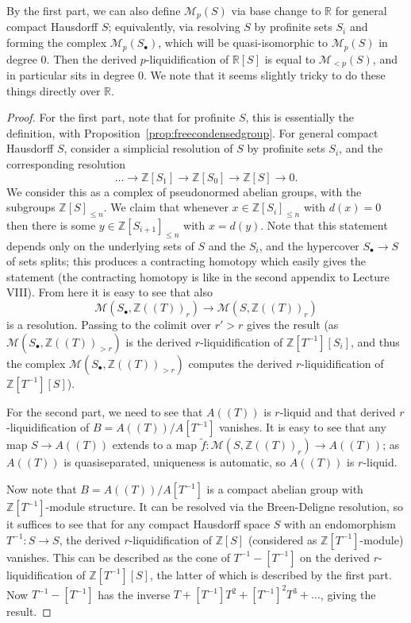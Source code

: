 \documentclass[11pt]{amsbook}
\renewcommand*{\tilde}{\widetilde}
\numberwithin{equation}{section}
\numberwithin{theorem}{section}
\theoremstyle{definition}
\begin{document}
By the first part, we can also define $\mathcal M_p(S)$ via base change to $\mathbb R$ for general compact Hausdorff $S$; equivalently, via resolving $S$ by profinite sets $S_i$ and forming the complex $\mathcal M_p(S_\bullet)$, which will be quasi-isomorphic to $\mathcal M_p(S)$ in degree $0$. Then the derived $p$-liquidification of $\mathbb R[S]$ is equal to $\mathcal M_{<p}(S)$, and in particular sits in degree $0$. We note that it seems slightly tricky to do these things directly over $\mathbb R$.

\begin{proof} For the first part, note that for profinite $S$, this is essentially the definition, with Proposition~\ref{prop:freecondensedgroup}. For general compact Hausdorff $S$, consider a simplicial resolution of $S$ by profinite sets $S_i$, and the corresponding resolution
\[
\ldots\to \mathbb Z[S_1]\to \mathbb Z[S_0]\to \mathbb Z[S]\to 0.
\]
We consider this as a complex of pseudonormed abelian groups, with the subgroups $\mathbb Z[S]_{\leq n}$. We claim that whenever $x\in \mathbb Z[S_i]_{\leq n}$ with $d(x)=0$ then there is some $y\in \mathbb Z[S_{i+1}]_{\leq n}$ with $x=d(y)$. Note that this statement depends only on the underlying sets of $S$ and the $S_i$, and the hypercover $S_\bullet\to S$ of sets splits; this produces a contracting homotopy which easily gives the statement (the contracting homotopy is like in the second appendix to Lecture VIII). From here it is easy to see that also
\[
\mathcal M(S_\bullet,\mathbb Z((T))_r)\to \mathcal M(S,\mathbb Z((T))_r)
\]
is a resolution. Passing to the colimit over $r'>r$ gives the result (as $\mathcal M(S_\bullet,\mathbb Z((T))_{>r})$ is the derived $r$-liquidification of $\mathbb Z[T^{-1}][S_i]$, and thus the complex $\mathcal M(S_\bullet,\mathbb Z((T))_{>r})$ computes the derived $r$-liquidification of $\mathbb Z[T^{-1}][S]$).

For the second part, we need to see that $A((T))$ is $r$-liquid and that derived $r$-liquidification of $B=A((T))/A[T^{-1}]$ vanishes. It is easy to see that any map $S\to A((T))$ extends to a map $\tilde{f}: \mathcal M(S,\mathbb Z((T))_r)\to A((T))$; as $A((T))$ is quasiseparated, uniqueness is automatic, so $A((T))$ is $r$-liquid.

Now note that $B=A((T))/A[T^{-1}]$ is a compact abelian group with $\mathbb Z[T^{-1}]$-module structure. It can be resolved via the Breen-Deligne resolution, so it suffices to see that for any compact Hausdorff space $S$ with an endomorphism $T^{-1}: S\to S$, the derived $r$-liquidification of $\mathbb Z[S]$ (considered as $\mathbb Z[T^{-1}]$-module) vanishes. This can be described as the cone of $T^{-1}-[T^{-1}]$ on the derived $r$-liquidification of $\mathbb Z[T^{-1}][S]$, the latter of which is described by the first part. Now $T^{-1}-[T^{-1}]$ has the inverse $T+[T^{-1}] T^2 + [T^{-1}]^2 T^3 + \ldots$, giving the result.
\end{proof}
\end{document}
